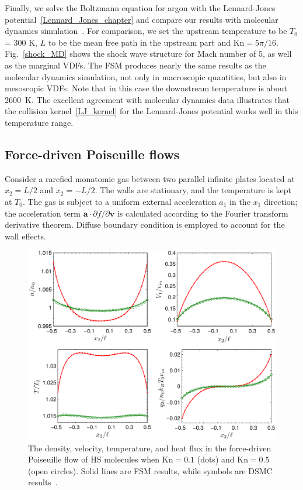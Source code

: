 Finally, we solve the Boltzmann equation for argon with the Lennard-Jones potential~\eqref{Lennard_Jones_chapter} and compare our results with molecular dynamics simulation~\cite{Valentini2009}. For comparison, we set the upstream temperature to be $T_0$ = 300 K, $L$ to be the mean free path in the upstream part and $\text{Kn}=5\pi/16$. Fig.~\ref{shock_MD} shows the shock wave structure for Mach number of 5, as well as the marginal VDFs. The FSM produces nearly the same results as the molecular dynamics simulation, not only in macroscopic quantities, but also in mesoscopic VDFs. Note that in this case the downstream temperature is about 2600~K. The excellent agreement with molecular dynamics data illustrates that the collision kernel~\eqref{LJ_kernel} for the Lennard-Jones potential works well in this temperature range.


\subsection{Force-driven Poiseuille flows}\label{force_driven}


Consider a rarefied monatomic gas between two parallel infinite plates located at $x_2=L/2$ and $x_2=-L/2$. The walls are stationary, and the temperature is kept at $T_0$. The gas is subject to a uniform external acceleration $a_1$ in the $x_1$ direction; the acceleration term $\bm{a}\cdot\partial f/\partial \bm{v}$ is calculated according to the Fourier transform derivative theorem. Diffuse boundary condition is employed to account for the wall effects.


\begin{figure}[t]
	\centering
	\includegraphics[width=12cm]{Chapter4/IMG/poiseuille_hard.pdf}
	\caption{
		The density, velocity, temperature, and heat flux in the force-driven Poiseuille flow of HS molecules when $\text{Kn}=0.1$ (dots) and $\text{Kn}=0.5$ (open circles). Solid lines are FSM results, while symbols are DSMC results~\cite{Meng2013JCP}.
	}
	\label{poiseuille_fig}
\end{figure}



